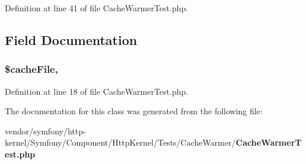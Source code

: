 Definition at line 41 of file Cache\+Warmer\+Test.\+php.



\subsection{Field Documentation}
\subsubsection[{\$cache\+File}]{\setlength{\rightskip}{0pt plus 5cm}\$cache\+File\hspace{0.3cm}{\ttfamily [static]}, {\ttfamily [protected]}}\label{class_symfony_1_1_component_1_1_http_kernel_1_1_tests_1_1_cache_warmer_1_1_cache_warmer_test_a27449648c91f145a3cf9c301ebda680f}


Definition at line 18 of file Cache\+Warmer\+Test.\+php.



The documentation for this class was generated from the following file\+:\begin{DoxyCompactItemize}
\item 
vendor/symfony/http-\/kernel/\+Symfony/\+Component/\+Http\+Kernel/\+Tests/\+Cache\+Warmer/{\bf Cache\+Warmer\+Test.\+php}\end{DoxyCompactItemize}
